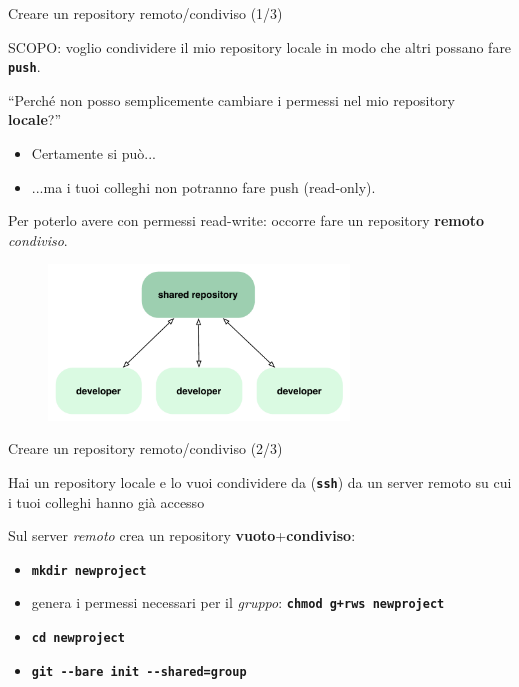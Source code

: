 \documentclass{beamer}
\begin{document}

\begin{frame}{\centerline{Creare un repository remoto/condiviso (1/3)}}
  \begin{center}
    SCOPO: voglio condividere il mio repository locale in modo che altri possano fare \texttt{\textbf{push}}.
  \end{center}
  ``Perch\'{e} non posso semplicemente cambiare i permessi nel mio repository \textbf{locale}?''
  \begin{itemize}
  \item Certamente si pu\`{o}...
  \item ...ma i tuoi colleghi non potranno fare push (\alert{read-only}).
  \end{itemize}
  \begin{center}
    Per poterlo avere con permessi \alert{read-write}: occorre fare un repository \textbf{remoto}
    \emph{condiviso}.
  \end{center}
  \begin{figure}
    \centering
    \includegraphics[width=8cm]{UniBo.IDSEPC.A2023.LavoroCondiviso/workflow-a}
  \end{figure}
\end{frame}

\begin{frame}{\centerline{Creare un repository remoto/condiviso (2/3)}}
  Hai un repository locale e lo vuoi condividere da 
  (\texttt{\textbf{ssh}}) da un server remoto su cui i tuoi colleghi hanno gi\`{a} accesso
  \begin{block}{Sul server \emph{remoto} crea un repository 
      \textbf{vuoto}+\textbf{condiviso}:}
    \begin{itemize}
    \item \texttt{\textbf{mkdir newproject}}
    \item genera i permessi necessari per il \emph{gruppo}: \texttt{\textbf{chmod g+rws newproject}}
    \item \texttt{\textbf{cd newproject}}
    \item \texttt{\textbf{git \alert{-{}-bare} init \alert{-{}-shared=group}}}
    \end{itemize}
  \end{block}

\end{frame}
\end{document}
